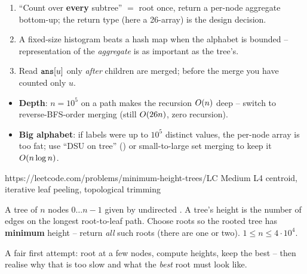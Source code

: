 \begin{insightbox}
\begin{enumerate}[nosep, leftmargin=1.6em]
  \item ``Count over \textbf{every} subtree'' $=$ root once, return a per-node aggregate
        bottom-up; the return type (here a 26-array) is the design decision.
  \item A fixed-size histogram beats a hash map when the alphabet is bounded -- representation
        of the \emph{aggregate} is as important as the tree's.
  \item Read $\texttt{ans}[u]$ only \emph{after} children are merged; before the merge you have
        counted only $u$.
\end{enumerate}
\end{insightbox}

\begin{hardeningbox}
\begin{itemize}[nosep, leftmargin=1.4em]
  \item \textbf{Depth}: $n=10^5$ on a path makes the recursion $O(n)$ deep -- switch to
        reverse-BFS-order merging (still $O(26n)$, zero recursion).
  \item \textbf{Big alphabet}: if labels were up to $10^5$ distinct values, the per-node array
        is too fat; use ``DSU on tree'' () or small-to-large set merging to keep
        it $O(n\log n)$.
\end{itemize}
\end{hardeningbox}


  {https://leetcode.com/problems/minimum-height-trees/}{LC Medium L4}
  {centroid, iterative leaf peeling, topological trimming}

\begin{problemstatement}
A tree of $n$ nodes $0\dots n-1$ given by undirected . A  tree's
height is the number of edges on the longest root-to-leaf path. Choose roots so the rooted
tree has \textbf{minimum} height -- return \emph{all} such roots (there are one or two).
$1 \le n \le 4\cdot10^4$.
\end{problemstatement}

\begin{attemptgate}
A fair first attempt: root at a few nodes, compute heights, keep the best -- then realise
why that is too slow and what the \emph{best} root must look like.
\end{attemptgate}

